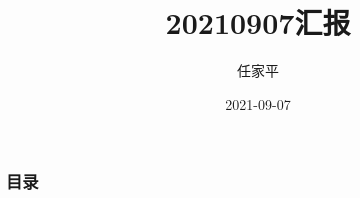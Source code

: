 \documentclass[12pt, utf-8]{beamer}
\title{20210907汇报}
\author{任家平}
\institute{同济大学测绘与地理信息学院}
\date{2021-09-07}
\begin{document}
\begin{frame}
    \titlepage
\end{frame}

\begin{frame}
    \frametitle{目录}
    \tableofcontents
\end{frame}





% 
\end{document}
